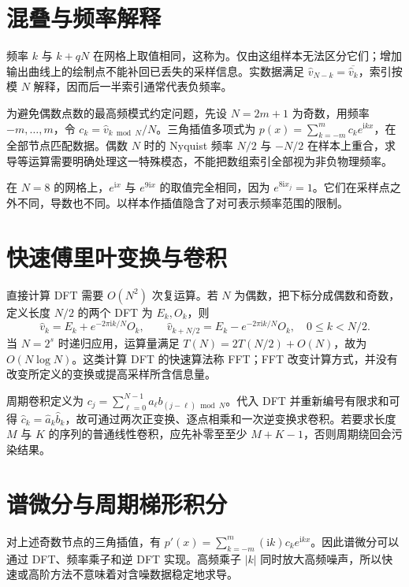 \documentclass[UTF8,12pt,a4paper,fontset=fandol]{ctexbook}
\begin{document}
\section{混叠与频率解释}
频率 $k$ 与 $k+qN$ 在网格上取值相同，这称为。仅由这组样本无法区分它们；增加输出曲线上的绘制点不能补回已丢失的采样信息。实数据满足 $\widehat v_{N-k}=\overline{\widehat v_k}$，索引按模 $N$ 解释，因而后一半索引通常代表负频率。

为避免偶数点数的最高频模式约定问题，先设 $N=2m+1$ 为奇数，用频率 $-m,\ldots,m$，令 $c_k=\widehat v_{k\bmod N}/N$。三角插值多项式为 $p(x)=\sum_{k=-m}^{m}c_ke^{\mathrm i kx}$，在全部节点匹配数据。偶数 $N$ 时的 Nyquist 频率 $N/2$ 与 $-N/2$ 在样本上重合，求导等运算需要明确处理这一特殊模态，不能把数组索引全部视为非负物理频率。

\begin{example}[样本无法识别的两种振荡]
在 $N=8$ 的网格上，$e^{\mathrm i x}$ 与 $e^{9\mathrm i x}$ 的取值完全相同，因为 $e^{8\mathrm i x_j}=1$。它们在采样点之外不同，导数也不同。以样本作插值隐含了对可表示频率范围的限制。
\end{example}

\section{快速傅里叶变换与卷积}
直接计算 DFT 需要 $O(N^2)$ 次复运算。若 $N$ 为偶数，把下标分成偶数和奇数，定义长度 $N/2$ 的两个 DFT 为 $E_k,O_k$，则
\[
 \widehat v_k=E_k+e^{-2\pi\mathrm i k/N}O_k,\qquad
 \widehat v_{k+N/2}=E_k-e^{-2\pi\mathrm i k/N}O_k,
 \quad0\le k<N/2.
\]
当 $N=2^s$ 时递归应用，运算量满足 $T(N)=2T(N/2)+O(N)$，故为 $O(N\log N)$。这类计算 DFT 的快速算法称 FFT；FFT 改变计算方式，并没有改变所定义的变换或提高采样所含信息量。

周期卷积定义为 $c_j=\sum_{\ell=0}^{N-1}a_\ell b_{(j-\ell)\bmod N}$。代入 DFT 并重新编号有限求和可得 $\widehat c_k=\widehat a_k\widehat b_k$，故可通过两次正变换、逐点相乘和一次逆变换求卷积。若要求长度 $M$ 与 $K$ 的序列的普通线性卷积，应先补零至至少 $M+K-1$，否则周期绕回会污染结果。

\section{谱微分与周期梯形积分}
对上述奇数节点的三角插值，有 $p'(x)=\sum_{k=-m}^{m}(\mathrm i k)c_ke^{\mathrm i kx}$。因此谱微分可以通过 DFT、频率乘子和逆 DFT 实现。高频乘子 $|k|$ 同时放大高频噪声，所以快速或高阶方法不意味着对含噪数据稳定地求导。
\end{document}
